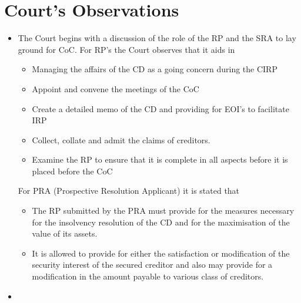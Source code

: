 \documentclass[12pt]{article}
\begin{document}
\section*{Court's Observations}

\begin{itemize}
	\item The Court begins with a discussion of the role of the RP and the SRA to lay ground for CoC. For RP's the Court observes that it aids in
		\begin{itemize}
			\item Managing the affairs of the CD as a going concern during the CIRP
			\item Appoint and convene the meetings of the CoC
			\item Create a detailed memo of the CD and providing for EOI's to facilitate IRP
			\item Collect, collate and admit the claims of creditors.
			\item Examine the RP to ensure that it is complete in all aspects before it is placed before the CoC
		\end{itemize}
		For PRA (Prospective Resolution Applicant) it is stated that
		\begin{itemize}
			\item The RP submitted by the PRA must provide for the measures necessary for the insolvency resolution of the CD and for the maximisation of the value of its assets.
			\item It is allowed to provide for either the satisfaction or modification of the security interest of the secured creditor and also may provide for a modification in the amount payable to various class of creditors.
		\end{itemize}
	\item 
\end{itemize}
\end{document}
